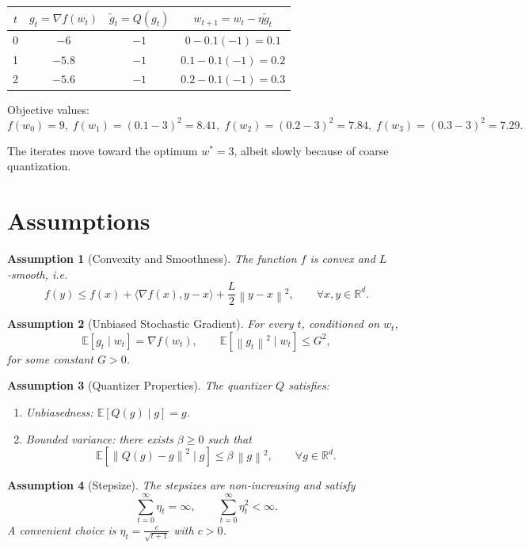 \documentclass{article}
\newtheorem{assumption}{Assumption}
\newcommand{\E}{\mathbb{E}}
\newcommand{\R}{\mathbb{R}}
\newcommand{\norm}[1]{\left\lVert#1\right\rVert}
\begin{document}
\begin{center}
\begin{tabular}{c|c|c|c}
$t$ & $g_{t}=\nabla f(w_{t})$ & $\tilde g_{t}=Q(g_{t})$ & $w_{t+1}=w_{t}-\eta\tilde g_{t}$ \\ \hline
0 & $-6$ & $-1$ & $0-0.1(-1)=0.1$ \\
1 & $-5.8$ & $-1$ & $0.1-0.1(-1)=0.2$ \\
2 & $-5.6$ & $-1$ & $0.2-0.1(-1)=0.3$
\end{tabular}
\end{center}

Objective values:
\[
f(w_{0})=9,\; f(w_{1})=(0.1-3)^{2}=8.41,\;
f(w_{2})=(0.2-3)^{2}=7.84,\;
f(w_{3})=(0.3-3)^{2}=7.29.
\]

The iterates move toward the optimum $w^{*}=3$, albeit slowly because of coarse quantization.

\newpage

\section*{Assumptions}
\begin{assumption}[Convexity and Smoothness]\label{ass:convex}
The function $f$ is convex and $L$‑smooth, i.e.
\[
f(y)\le f(x)+\langle\nabla f(x),y-x\rangle+\frac{L}{2}\norm{y-x}^{2},
\qquad\forall x,y\in\R^{d}.
\]
\end{assumption}

\begin{assumption}[Unbiased Stochastic Gradient]\label{ass:sgd}
For every $t$, conditioned on $w_{t}$,
\[
\E[g_{t}\mid w_{t}]=\nabla f(w_{t}),\qquad 
\E[\norm{g_{t}}^{2}\mid w_{t}]\le G^{2},
\]
for some constant $G>0$.
\end{assumption}

\begin{assumption}[Quantizer Properties]\label{ass:quant}
The quantizer $Q$ satisfies:
\begin{enumerate}[label=(\alph*)]
\item Unbiasedness: $\E[Q(g)\mid g]=g$.
\item Bounded variance: there exists $\beta\ge0$ such that
\[
\E\!\left[\norm{Q(g)-g}^{2}\mid g\right]\le\beta\,\norm{g}^{2},
\qquad\forall g\in\R^{d}.
\]
\end{enumerate}
\end{assumption}

\begin{assumption}[Stepsize]\label{ass:stepsize}
The stepsizes are non‑increasing and satisfy
\[
\sum_{t=0}^{\infty}\eta_{t}= \infty,\qquad
\sum_{t=0}^{\infty}\eta_{t}^{2}<\infty .
\]
A convenient choice is $\eta_{t}= \frac{c}{\sqrt{t+1}}$ with $c>0$.
\end{assumption}
\end{document}
